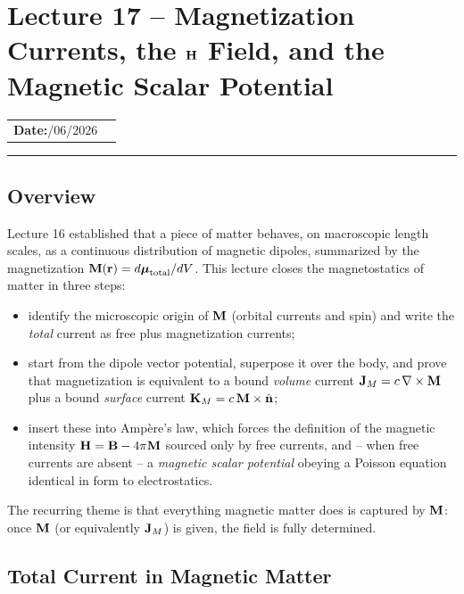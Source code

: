 \section{Lecture 17 -- Magnetization Currents, the $\mathbf{H}$ Field, and the Magnetic Scalar Potential}\label{sec:lec17}

\begin{center}
\begin{tabular}{ll}
  \textbf{Date:}\quad 02/06/2026 & \\
\end{tabular}
\end{center}
\hrule\vspace{1.5em}

\subsection*{Overview}

Lecture 16 established that a piece of matter behaves, on macroscopic length scales,
as a continuous distribution of magnetic dipoles, summarized by the magnetization
$\mathbf{M}(\mathbf{r})=d\boldsymbol{\mu}_{\rm total}/dV$.  This lecture closes the magnetostatics of matter
in three steps:
\begin{itemize}
  \item identify the microscopic origin of $\mathbf{M}$ (orbital currents and spin) and
        write the \emph{total} current as free plus magnetization currents;
  \item start from the dipole vector potential, superpose it over the body, and prove
        that magnetization is equivalent to a bound \emph{volume} current
        $\mathbf{J}_M=c\,\nabla\times\mathbf{M}$ plus a bound \emph{surface} current
        $\mathbf{K}_M=c\,\mathbf{M}\times\hat{\mathbf{n}}$;
  \item insert these into Amp\`ere's law, which forces the definition of the magnetic
        intensity $\mathbf{H}=\mathbf{B}-4\pi\mathbf{M}$ sourced only by free currents, and -- when
        free currents are absent -- a \emph{magnetic scalar potential} obeying a
        Poisson equation identical in form to electrostatics.
\end{itemize}
The recurring theme is that everything magnetic matter does is captured by $\mathbf{M}$:
once $\mathbf{M}$ (or equivalently $\mathbf{J}_M$) is given, the field is fully determined.

\subsection{Total Current in Magnetic Matter}\label{subsec:lec17-total-current}

